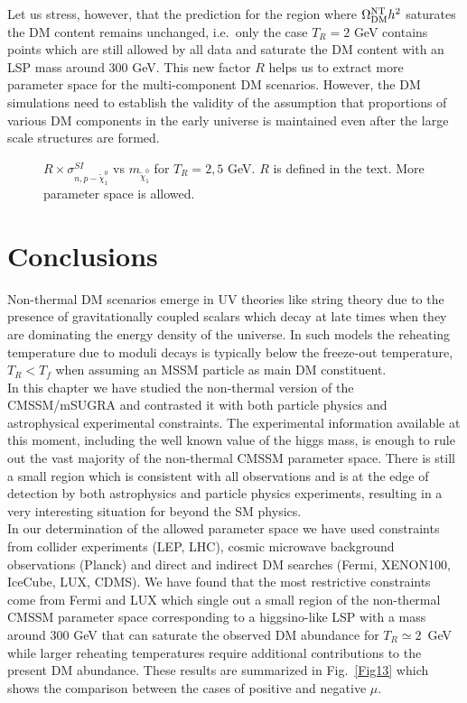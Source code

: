\documentclass[12pt,a4paper]{book}
\begin{document}
Let us stress, however, that the prediction for the region where $\Omega^{\rm NT}_{\rm DM} h^2$ saturates the DM content remains unchanged, i.e.~only the case $T_R=2$ GeV contains points which are still allowed by all data and saturate the DM content with an LSP mass around $300$ GeV. This new factor $R$ helps us to extract more parameter space for the multi-component DM scenarios. However, the DM simulations need to establish the validity of  the assumption that proportions of various DM components in the early universe is maintained even after the large scale structures are formed.

\begin{figure}
\centering
{} \quad
{} 
\caption{$R\times\sigma^{SI}_{n,p-\tilde\chi^0_1}$ vs $m_{\tilde\chi^0_1}$ for $T_R=2, 5$ GeV. $R$ is defined in the text. More parameter space is allowed.}
\label{Fig15}
\end{figure}

\section{Conclusions}

Non-thermal DM scenarios emerge in UV theories like string theory due to the presence of gravitationally coupled scalars which decay at late times when they are dominating the energy density of the universe. In such models the reheating temperature due to moduli decays is typically below the freeze-out temperature, $T_R<T_f$ when assuming an MSSM particle as main DM constituent.\\

In this chapter we have studied the non-thermal version of the CMSSM/mSUGRA and contrasted it with both particle physics and astrophysical experimental constraints. The experimental information available at this moment, including the well known value of the higgs mass, is enough to rule out the vast majority of the non-thermal CMSSM parameter space. There is still a small region which is consistent with all observations and is at the edge of detection by both astrophysics and particle physics experiments, resulting in a very interesting situation for beyond the SM physics.\\

In our determination of the allowed parameter space we have used constraints from collider experiments (LEP, LHC), cosmic microwave background observations (Planck) and direct and indirect DM searches (Fermi, XENON100, IceCube, LUX, CDMS). We have found that the most restrictive constraints come from Fermi and LUX which single out a small region of the non-thermal CMSSM parameter space corresponding to a higgsino-like LSP with a mass around $300$ GeV that can saturate the observed DM abundance for $T_R\simeq 2$~GeV while larger reheating temperatures require additional contributions to the present DM abundance. These results are summarized in Fig.~\ref{Fig13} which shows the comparison between the cases of positive and negative $\mu$.\\
\end{document}
